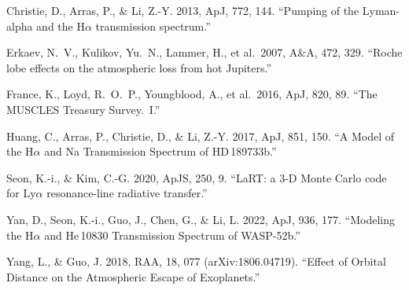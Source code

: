 \documentclass[english,a4paper]{kiseon_memo}
\begin{document}
Christie, D., Arras, P., \& Li, Z.-Y. 2013, ApJ, 772, 144.
``Pumping of the Lyman-alpha and the H$\alpha$ transmission spectrum.''

Erkaev, N.~V., Kulikov, Yu.~N., Lammer, H., et al.\ 2007, A\&A, 472, 329.
``Roche lobe effects on the atmospheric loss from hot Jupiters.''

France, K., Loyd, R.~O.~P., Youngblood, A., et al.\ 2016, ApJ, 820, 89.
``The MUSCLES Treasury Survey.~I.''

Huang, C., Arras, P., Christie, D., \& Li, Z.-Y. 2017, ApJ, 851, 150.
``A Model of the H$\alpha$ and Na Transmission Spectrum of HD\,189733b.''

Seon, K.-i., \& Kim, C.-G. 2020, ApJS, 250, 9.
``LaRT: a 3-D Monte Carlo code for Ly$\alpha$ resonance-line radiative transfer.''

Yan, D., Seon, K.-i., Guo, J., Chen, G., \& Li, L. 2022, ApJ, 936, 177.
``Modeling the H$\alpha$ and He\,10830 Transmission Spectrum of WASP-52b.''

Yang, L., \& Guo, J. 2018, RAA, 18, 077 (arXiv:1806.04719).
``Effect of Orbital Distance on the Atmospheric Escape of Exoplanets.''
\endgroup
\end{document}
